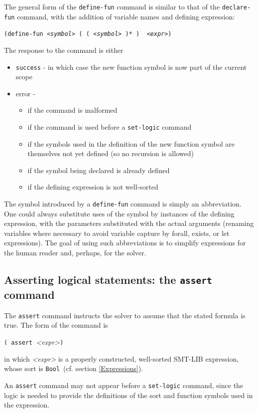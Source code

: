 \documentclass[12pt,oneside]{report}
\newcommand{\expr}{{\it <expr>}}
\newcommand{\sym}{{\it <symbol>}}
\newcommand{\Bool}{{\tt Bool}}
\newcommand{\Sort}{{\it <sort-expr>}}
\newcommand{\nospace}{\setlength{\itemsep}{0in}\setlength{\parsep}{0in}\setlength{\parskip}{0in}\setlength{\topsep}{0in}}
\begin{document}
The general form of the {\tt define-fun} command is similar to that of the {\tt declare-fun} command, with the addition of variable names and defining expression:\\
\centerline{\tt (define-fun \sym\ ( ( \sym\ \Sort )* ) \Sort\ \expr )}
The response to the command is either
\begin{itemize} \nospace
\item {\tt success} - in which case the new function symbol is now part of the current scope
\item error - 
\begin{itemize} \nospace
\item if the command is malformed
\item if the command is used before a {\tt set-logic} command
\item if the symbols used in the definition of the new function symbol are themselves not yet defined (so no recursion is allowed)
\item if the symbol being declared is already defined
\item if the defining expression is not well-sorted
\end{itemize}
\end{itemize}
The symbol introduced by a {\tt define-fun} command is simply an abbreviation.  One could always substitute uses of the symbol by instances of the defining expression, with the parameters substituted with the actual arguments (renaming variables where necessary to avoid variable capture by forall, exists, or let expressions). The goal of using such abbreviations is to simplify expressions for the human reader and,
perhaps, for the solver.

\subsection{Asserting logical statements: the {\tt assert} command}

The {\tt assert} command instructs the solver to assume that the stated formula is true.  The form of the command is\\
\centerline{{\tt ( assert }{\it <expr>}{\tt )}}
in which {\it <expr>} is a properly constructed, well-sorted SMT-LIB expression, whose sort is \Bool\ (cf. section \ref{Expressions}).

An {\tt assert} command may not appear before a {\tt set-logic} command, since the logic is needed to provide the definitions of the sort and
function symbols used in the expression. 
\end{document}
